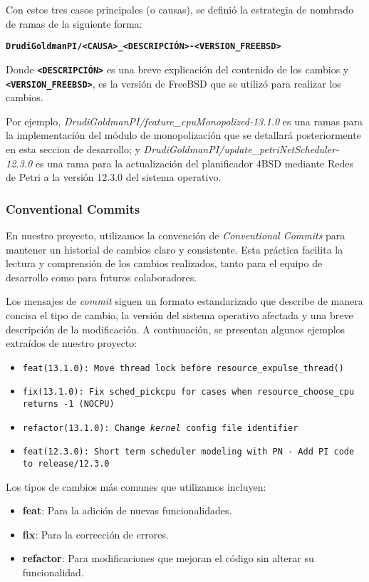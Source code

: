 Con estos tres casos principales (o causas), se definió la estrategia de nombrado de ramas de la siguiente forma:

\begin{center}
    \texttt{\textbf{DrudiGoldmanPI/<CAUSA>\_<DESCRIPCIÓN>-<VERSION\_FREEBSD>}}
\end{center}

Donde \texttt{\textbf{<DESCRIPCIÓN>}} es una breve explicación del contenido de los cambios y \texttt{\textbf{<VERSION\_FREEBSD>}}, es la versión de FreeBSD que se utilizó para realizar los cambios.

Por ejemplo, \textit{DrudiGoldmanPI/feature\_cpuMonopolized-13.1.0} es una ramas para la implementación del módulo de monopolización que se detallará posteriormente en esta seccion de desarrollo; y \textit{DrudiGoldmanPI/update\_petriNetScheduler-12.3.0} es una rama para la actualización del planificador 4BSD mediante Redes de Petri a la versión 12.3.0 del sistema operativo.

\subsubsection{Conventional Commits}
En nuestro proyecto, utilizamos la convención de \textit{Conventional Commits} para mantener un historial de cambios claro y consistente. Esta práctica facilita la lectura y comprensión de los cambios realizados, tanto para el equipo de desarrollo como para futuros colaboradores.

Los mensajes de \textit{commit} siguen un formato estandarizado que describe de manera concisa el tipo de cambio, la versión del sistema operativo afectada y una breve descripción de la modificación. A continuación, se presentan algunos ejemplos extraídos de nuestro proyecto:

\begin{itemize}
    \item \texttt{feat(13.1.0): Move thread lock before resource\_expulse\_thread()}
    \item \texttt{fix(13.1.0): Fix sched\_pickcpu for cases when resource\_choose\_cpu returns -1 (NOCPU)}
    \item \texttt{refactor(13.1.0): Change \textit{kernel} config file identifier}
    \item \texttt{feat(12.3.0): Short term scheduler modeling with PN - Add PI code to release/12.3.0}
\end{itemize}

Los tipos de cambios más comunes que utilizamos incluyen:
\begin{itemize}
    \item \textbf{feat}: Para la adición de nuevas funcionalidades.
    \item \textbf{fix}: Para la corrección de errores.
    \item \textbf{refactor}: Para modificaciones que mejoran el código sin alterar su funcionalidad.
\end{itemize}

